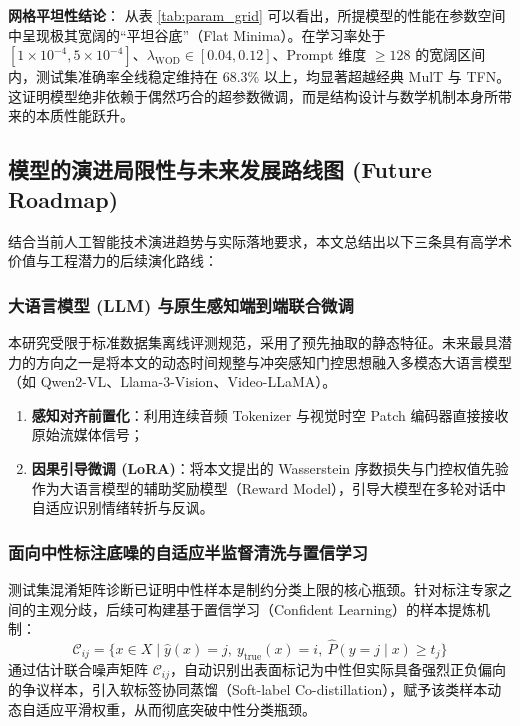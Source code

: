 \textbf{网格平坦性结论}：
从表 \ref{tab:param_grid} 可以看出，所提模型的性能在参数空间中呈现极其宽阔的“平坦谷底”（Flat Minima）。在学习率处于 $[1\times 10^{-4}, 5\times 10^{-4}]$、$\lambda_{\text{WOD}} \in [0.04, 0.12]$、Prompt 维度 $\ge 128$ 的宽阔区间内，测试集准确率全线稳定维持在 68.3\% 以上，均显著超越经典 MulT 与 TFN。这证明模型绝非依赖于偶然巧合的超参数微调，而是结构设计与数学机制本身所带来的本质性能跃升。

\clearpage

\subsection{模型的演进局限性与未来发展路线图 (Future Roadmap)}
结合当前人工智能技术演进趋势与实际落地要求，本文总结出以下三条具有高学术价值与工程潜力的后续演化路线：

\subsubsection{大语言模型 (LLM) 与原生感知端到端联合微调}
本研究受限于标准数据集离线评测规范，采用了预先抽取的静态特征。未来最具潜力的方向之一是将本文的动态时间规整与冲突感知门控思想融入多模态大语言模型（如 Qwen2-VL、Llama-3-Vision、Video-LLaMA）。
\begin{enumerate}
    \item \textbf{感知对齐前置化}：利用连续音频 Tokenizer 与视觉时空 Patch 编码器直接接收原始流媒体信号；
    \item \textbf{因果引导微调 (LoRA)}：将本文提出的 Wasserstein 序数损失与门控权值先验作为大语言模型的辅助奖励模型（Reward Model），引导大模型在多轮对话中自适应识别情绪转折与反讽。
\end{enumerate}

\subsubsection{面向中性标注底噪的自适应半监督清洗与置信学习}
测试集混淆矩阵诊断已证明中性样本是制约分类上限的核心瓶颈。针对标注专家之间的主观分歧，后续可构建基于置信学习（Confident Learning）的样本提炼机制：
\begin{equation}
\mathcal{C}_{ij} = \big\{ x \in X \mid \hat{y}(x) = j, \ y_{\text{true}}(x) = i, \ \hat{P}(y=j \mid x) \ge t_j \big\}
\end{equation}
通过估计联合噪声矩阵 $\mathcal{C}_{ij}$，自动识别出表面标记为中性但实际具备强烈正负偏向的争议样本，引入软标签协同蒸馏（Soft-label Co-distillation），赋予该类样本动态自适应平滑权重，从而彻底突破中性分类瓶颈。

